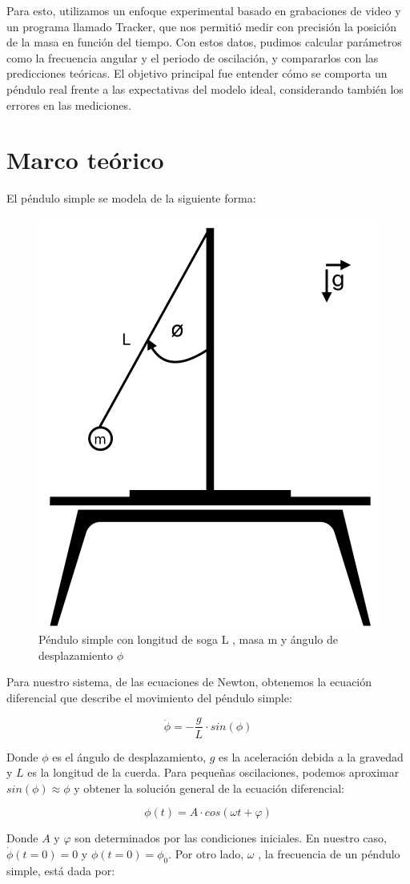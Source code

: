 \documentclass[12pt,a4]{article}
\begin{document}
Para esto, utilizamos un enfoque experimental basado en grabaciones de video y un programa llamado Tracker, que nos permitió medir con precisión la posición de la masa en función del tiempo. 
Con estos datos, pudimos calcular parámetros como la frecuencia angular y el periodo de oscilación, y compararlos con las predicciones teóricas. 
El objetivo principal fue entender cómo se comporta un péndulo real frente a las expectativas del modelo ideal, considerando también los errores en las mediciones.

\section{Marco teórico}

El péndulo simple se modela de la siguiente forma:

\begin{figure}[H]
    \centering
    \includegraphics[width=0.3\linewidth]{pendulo_frente.png}
    \caption{Péndulo simple con longitud de soga L , masa m y ángulo de desplazamiento $\phi$}   
    \label{fig:pendulo}
\end{figure}

Para nuestro sistema, de las ecuaciones de Newton, obtenemos la ecuación diferencial que describe el movimiento del péndulo simple:

\begin{equation}
    \ddot{\phi} = -\frac{g}{L} \cdot sin(\phi)
\end{equation}

Donde $\phi$ es el ángulo de desplazamiento, $g$ es la aceleración debida a la gravedad y $L$ es la longitud de la cuerda. 
Para pequeñas oscilaciones, podemos aproximar $sin(\phi) \approx \phi$ y obtener la solución general de la ecuación diferencial:

\begin{equation}
    \phi(t) = A \cdot cos(\omega t + \varphi)
\end{equation}

Donde $A$ y $\varphi$ son determinados por las condiciones iniciales. 
En nuestro caso, $\dot{\phi}(t=0) = 0$ y $\phi(t=0) = \phi_0$. 
Por otro lado, $\omega$ , la frecuencia de un péndulo simple, está dada por:
\end{document}

